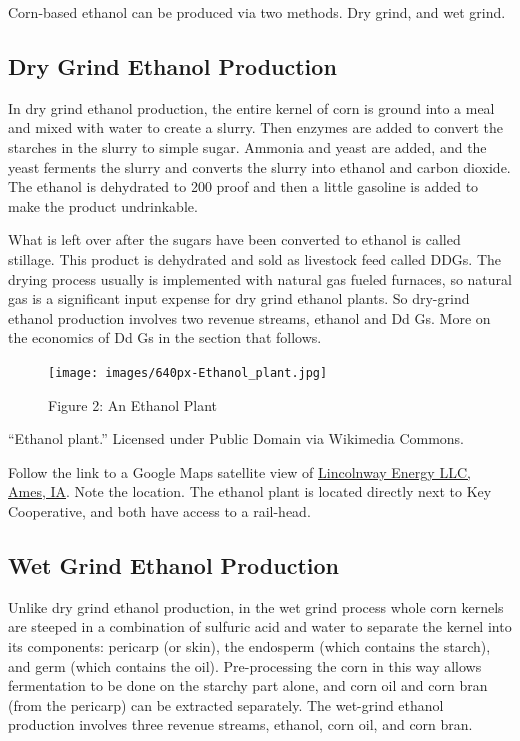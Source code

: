 \documentclass[
]{book}
\begin{document}
Corn-based ethanol can be produced via two methods. Dry grind, and wet grind.

\hypertarget{dry-grind-ethanol-production}{%
\subsection{Dry Grind Ethanol Production}\label{dry-grind-ethanol-production}}

In dry grind ethanol production, the entire kernel of corn is ground into a meal and mixed with water to create a slurry. Then enzymes are added to convert the starches in the slurry to simple sugar. Ammonia and yeast are added, and the yeast ferments the slurry and converts the slurry into ethanol and carbon dioxide. The ethanol is dehydrated to 200 proof and then a little gasoline is added to make the product undrinkable.

What is left over after the sugars have been converted to ethanol is called stillage. This product is dehydrated and sold as livestock feed called DDGs. The drying process usually is implemented with natural gas fueled furnaces, so natural gas is a significant input expense for dry grind ethanol plants. So dry-grind ethanol production involves two revenue streams, ethanol and Dd Gs. More on the economics of Dd Gs in the section that follows.

\begin{figure}
\centering
\texttt{[image: images/640px-Ethanol\_plant.jpg]}
\caption{Figure 2: An Ethanol Plant}
\end{figure}

``Ethanol plant.'' Licensed under Public Domain via Wikimedia Commons.

Follow the link to a Google Maps satellite view of \href{https://www.google.com/maps/place/Lincolnway+Energy+LLC/@42.0259566,-93.5094383,1084m/data=!3m1!1e3!4m2!3m1!1s0x0000000000000000:0xe75269d9c81692ab!6m1!1e1}{Lincolnway Energy LLC, Ames, IA}. Note the location. The ethanol plant is located directly next to Key Cooperative, and both have access to a rail-head.

\hypertarget{wet-grind-ethanol-production}{%
\subsection{Wet Grind Ethanol Production}\label{wet-grind-ethanol-production}}

Unlike dry grind ethanol production, in the wet grind process whole corn kernels are steeped in a combination of sulfuric acid and water to separate the kernel into its components: pericarp (or skin), the endosperm (which contains the starch), and germ (which contains the oil). Pre-processing the corn in this way allows fermentation to be done on the starchy part alone, and corn oil and corn bran (from the pericarp) can be extracted separately. The wet-grind ethanol production involves three revenue streams, ethanol, corn oil, and corn bran.
\end{document}
